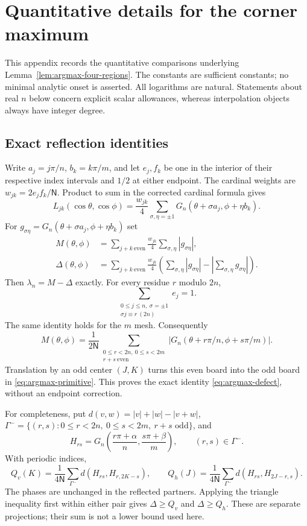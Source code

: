 \section{Quantitative details for the corner maximum}
\label{app:argmax-details}

This appendix records the quantitative comparisons underlying
Lemma~\ref{lem:argmax-four-regions}.  The constants are sufficient
constants; no minimal analytic onset is asserted.  All logarithms are
natural.  Statements about real $n$ below concern explicit scalar
allowances, whereas interpolation objects always have integer degree.

\subsection{Exact reflection identities}

Write $a_j=j\pi/n$, $b_k=k\pi/m$, and let $e_j,f_k$ be one in the
interior of their respective index intervals and $1/2$ at either
endpoint.  The cardinal weights are $w_{jk}=2e_jf_k/\mathsf N$.  Product to sum
in the corrected cardinal formula gives
\[
 L_{jk}(\cos\theta,\cos\phi)
 =\frac{w_{jk}}4\sum_{\sigma,\eta=\pm1}
       G_n(\theta+\sigma a_j,\phi+\eta b_k).
\]
For $g_{\sigma\eta}=G_n(\theta+\sigma a_j,\phi+\eta b_k)$ set
\begin{align*}
 M(\theta,\phi)&=\sum_{j+k\ \text{even}}
                     \frac{w_{jk}}4\sum_{\sigma,\eta}|g_{\sigma\eta}|,\\
 \Delta(\theta,\phi)&=\sum_{j+k\ \text{even}}\frac{w_{jk}}4
       \left(\sum_{\sigma,\eta}|g_{\sigma\eta}|
                       -\left|\sum_{\sigma,\eta}g_{\sigma\eta}\right|\right).
\end{align*}
Then $\lambda_n=M-\Delta$ exactly.  For every residue $r$ modulo $2n$,
\[
 \sum_{\substack{0\leq j\leq n,\ \sigma=\pm1\\
                   \sigma j\equiv r\ (2n)}}e_j=1.
\]
The same identity holds for the $m$ mesh.  Consequently
\[
 M(\theta,\phi)=\frac1{2\mathsf N}
 \sum_{\substack{0\leq r<2n,\ 0\leq s<2m\\r+s\ \text{even}}}
       |G_n(\theta+r\pi/n,\phi+s\pi/m)|.
\]
Translation by an odd center $(J,K)$ turns this even board into the odd
board in \eqref{eq:argmax-primitive}.  This proves the exact identity
\eqref{eq:argmax-defect}, without an endpoint correction.

For completeness, put $d(v,w)=|v|+|w|-|v+w|$,
$\Gamma^-=\{(r,s):0\leq r<2n,\ 0\leq s<2m,\ r+s\text{ odd}\}$, and
\[
 H_{rs}=G_n\left(\frac{r\pi+\alpha}{n},
                    \frac{s\pi+\beta}{m}\right),\qquad (r,s)\in\Gamma^-.
\]
With periodic indices,
\begin{equation}
 Q_v(K)=\frac1{4\mathsf N}\sum_{\Gamma^-}d(H_{rs},H_{r,2K-s}),\qquad
 Q_h(J)=\frac1{4\mathsf N}\sum_{\Gamma^-}d(H_{rs},H_{2J-r,s}).
                                                        \label{eq:argmax-projections}
\end{equation}
The phases are unchanged in the reflected partners.  Applying the
triangle inequality first within either pair gives
$\Delta\geq Q_v$ and $\Delta\geq Q_h$.  These are separate projections;
their sum is not a lower bound used here.

